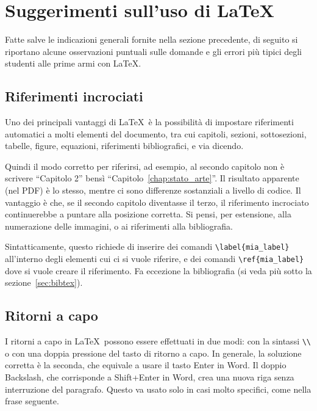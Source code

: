 \documentclass[12pt]{report}
\begin{document}
    \section{Suggerimenti sull'uso di \LaTeX}
    \label{sec:consigli_latex}

    Fatte salve le indicazioni generali fornite nella sezione precedente, di seguito si riportano alcune osservazioni puntuali sulle domande e gli errori pi\`u tipici degli studenti alle prime armi con \LaTeX.

    \subsection{Riferimenti incrociati}

    Uno dei principali vantaggi di \LaTeX\ è la possibilità di impostare riferimenti automatici a molti elementi del documento, tra cui capitoli, sezioni, sottosezioni, tabelle, figure, equazioni, riferimenti bibliografici, e via dicendo.

    Quindi il modo corretto per riferirsi, ad esempio, al secondo capitolo non è scrivere ``Capitolo 2'' bensì ``Capitolo~\ref{chap:stato_arte}''. Il risultato apparente (nel PDF) è lo stesso, mentre ci sono differenze sostanziali a livello di codice. Il vantaggio è che, se il secondo capitolo diventasse il terzo, il riferimento incrociato continuerebbe a puntare alla posizione corretta. Si pensi, per estensione, alla numerazione delle immagini, o ai riferimenti alla bibliografia.

    Sintatticamente, questo richiede di inserire dei comandi \verb|\label{mia_label}| all'interno degli elementi cui ci si vuole riferire, e dei comandi \verb|\ref{mia_label}| dove si vuole creare il riferimento. Fa eccezione la bibliografia (si veda pi\`u sotto la sezione~\ref{sec:bibtex}).


    \subsection{Ritorni a capo}

    I ritorni a capo in \LaTeX\ possono essere effettuati in due modi: con la sintassi \verb|\\| o con una doppia pressione del tasto di ritorno a capo. In generale, la soluzione corretta è la seconda, che equivale a usare il tasto Enter in Word. Il doppio Backslash, che corrisponde a Shift+Enter in Word, crea una nuova riga senza interruzione del paragrafo. Questo va usato solo in casi molto specifici, come nella frase seguente.
\end{document}

